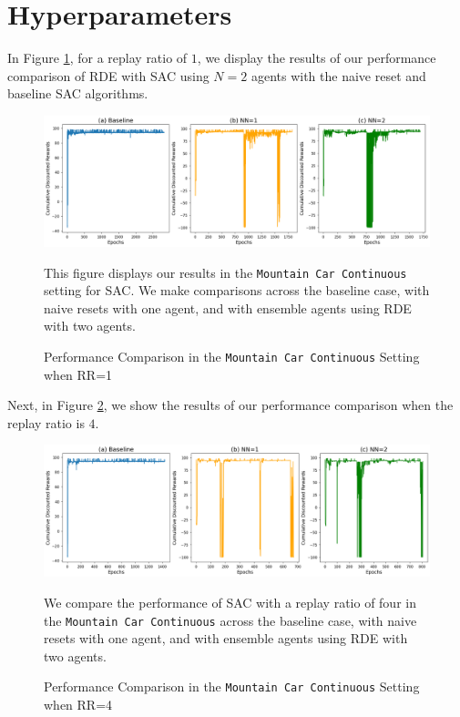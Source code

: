 \documentclass[base]{subfiles}
\begin{document}
\section{Hyperparameters}\label{app:c}

In Figure \ref{fig:mc_rr1}, for a replay ratio of $1$, we display the results of our performance comparison of RDE with SAC using $N=2$ agents with the naive reset and baseline SAC algorithms.

\begin{figure}[h!]
    \centering
    \caption{Performance Comparison in the \texttt{Mountain Car Continuous} Setting when RR=1}
    \label{fig:mc_rr1}
    \includegraphics[width = 1 \linewidth]{mc_RR1.png}
    \begin{flushleft} This figure displays our results in the \texttt{Mountain Car Continuous} setting for SAC. We make comparisons across the baseline case, with naive resets with one agent, and with ensemble agents using RDE with two agents. \end{flushleft}
\end{figure}

Next, in Figure \ref{fig:mc_rr4}, we show the results of our performance comparison when the replay ratio is $4$.

\begin{figure}[h!]
    \centering
    \caption{Performance Comparison in the \texttt{Mountain Car Continuous} Setting when RR=4}
    \label{fig:mc_rr4}
    \includegraphics[width = 1 \linewidth]{mc_RR4.png}
    \begin{flushleft} We compare the performance of SAC with a replay ratio of four in the \texttt{Mountain Car Continuous} across the baseline case, with naive resets with one agent, and with ensemble agents using RDE with two agents. \end{flushleft}
\end{figure}
\end{document}
